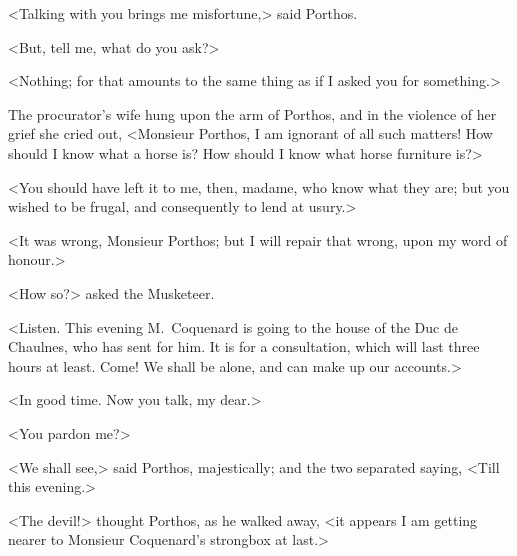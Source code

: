 <Talking with you brings me misfortune,> said Porthos. 

<But, tell me, what do you ask?> 

<Nothing; for that amounts to the same thing as if I asked you for something.> 

The procurator's wife hung upon the arm of Porthos, and in the violence of her grief she cried out, <Monsieur Porthos, I am ignorant of all such matters! How should I know what a horse is? How should I know what horse furniture is?> 

<You should have left it to me, then, madame, who know what they are; but you wished to be frugal, and consequently to lend at usury.> 

<It was wrong, Monsieur Porthos; but I will repair that wrong, upon my word of honour.> 

<How so?> asked the Musketeer. 

<Listen. This evening M.~Coquenard is going to the house of the Duc de Chaulnes, who has sent for him. It is for a consultation, which will last three hours at least. Come! We shall be alone, and can make up our accounts.> 

<In good time. Now you talk, my dear.> 

<You pardon me?> 

<We shall see,> said Porthos, majestically; and the two separated saying, <Till this evening.> 

<The devil!> thought Porthos, as he walked away, <it appears I am getting nearer to Monsieur Coquenard's strongbox at last.> 
